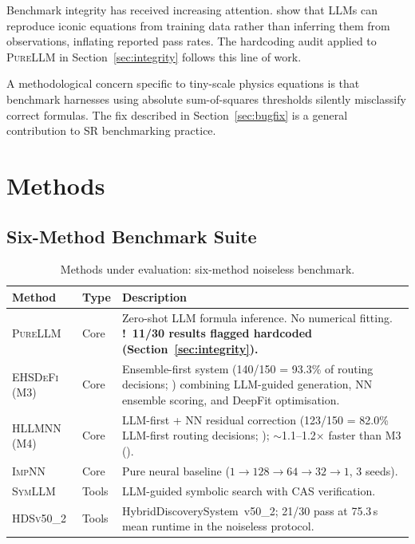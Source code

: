 \documentclass[twoside,11pt]{article}
\newcommand{\PureLLM}{\textsc{PureLLM}}
\newcommand{\INN}{\textsc{ImpNN}}
\newcommand{\EHD}{\textsc{EHSDeFi}}
\newcommand{\HSL}{\textsc{HLLMNN}}
\newcommand{\SEL}{\textsc{SymLLM}}
\newcommand{\HDS}{\textsc{HDSv50\_2}}
\newcommand{\warn}{{\color{warnAmber}\textbf{!}}}
\begin{document}
Benchmark integrity has received increasing attention.
\citet{memorization2024audit} show that LLMs can reproduce iconic equations
from training data rather than inferring them from observations, inflating
reported pass rates.  The hardcoding audit applied to \PureLLM{} in
Section~\ref{sec:integrity} follows this line of work.

A methodological concern specific to tiny-scale physics equations is that
benchmark harnesses using absolute sum-of-squares thresholds silently
misclassify correct formulas.  The fix described in Section~\ref{sec:bugfix}
is a general contribution to SR benchmarking practice.

\section{Methods}
\label{sec:methods}

\subsection{Six-Method Benchmark Suite}
\label{sec:methods:sixmethod}

\begin{table}[ht]
\caption{Methods under evaluation: six-method noiseless benchmark.}
\label{tab:methods}
\centering
\small
\renewcommand{\arraystretch}{1.3}
\begin{tabular}{L{2.1cm} L{1.3cm} L{8.0cm}}
\toprule
\textbf{Method} & \textbf{Type} & \textbf{Description} \\
\midrule
{}
\PureLLM & Core &
  Zero-shot LLM formula inference.  No numerical fitting.
  \textbf{\warn~11/30 results flagged hardcoded (Section~\ref{sec:integrity}).} \\
\EHD\,(M3) & Core &
  Ensemble-first system (140/150 = 93.3\% of routing decisions; ) combining LLM-guided generation,
  NN ensemble scoring, and DeepFit optimisation. \\
\HSL\,(M4) & Core &
  LLM-first + NN residual correction (123/150 = 82.0\% LLM-first routing decisions; );
  $\sim$1.1--1.2$\times$ faster than M3 (). \\
\INN & Core &
  Pure neural baseline ($1\!\to\!128\!\to\!64\!\to\!32\!\to\!1$, 3 seeds). \\
\SEL & Tools &
  LLM-guided symbolic search with CAS verification. \\
\HDS & Tools &
  HybridDiscoverySystem~v50\_2; 21/30 pass at 75.3\,s mean runtime in the noiseless protocol. \\
\bottomrule
\end{tabular}
\end{table}
\end{document}
